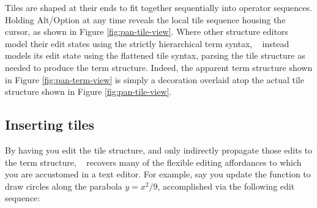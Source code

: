 Tiles are shaped at their ends to fit together sequentially
into operator sequences.
Holding Alt/Option at any time reveals the local tile sequence
housing the cursor, as shown in Figure \ref{fig:pan-tile-view}.
Where other structure editors model their edit states
using the strictly hierarchical term syntax,
\tylr~ instead models its edit state
using the flattened tile syntax, parsing the tile structure
as needed to produce the term structure.
Indeed, the apparent term structure shown in Figure
\ref{fig:pan-term-view} is simply a
decoration overlaid atop the actual tile structure shown in
Figure \ref{fig:pan-tile-view}.




\subsection{Inserting tiles}
By having you edit the tile structure, and only
indirectly propagate those edits to the term structure,
\tylr~ recovers many of the flexible editing affordances to
which you are accustomed in a text editor.
For example, say you update the function to
draw circles along the parabola $y = x^2/9$,
accomplished via the following edit sequence:

